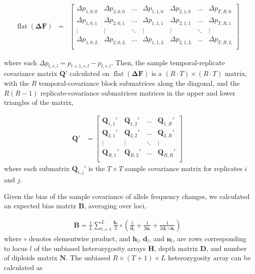 \documentclass[11pt]{article}
\DeclareMathOperator{\flt}{\mathrm{flat}}
\begin{document}
\begin{align}
    \flt(\mathbf{\Delta F}) &=
                    &\begin{bmatrix} 
    \Delta p_{1, 0, 0} & \Delta p_{2, 0, 0} & \ldots & \Delta p_{1, 1, 0} & \Delta p_{2, 1, 0} & \ldots & \Delta p_{T, R, 0}  \\
    \Delta p_{1, 0, 1} & \Delta p_{2, 0, 1} & \ldots & \Delta p_{1, 1, 1} & \Delta p_{2, 1, 1} & \ldots & \Delta p_{T, R, 1}  \\
    \vdots & \vdots & \ddots & \vdots & \vdots & \ddots & \vdots  \\
    \Delta p_{1, 0, L} & \Delta p_{2, 0, L} & \ldots & \Delta p_{1, 1, L} & \Delta p_{2, 1, L} & \ldots & \Delta p_{T, R, L}  \\
  \end{bmatrix} 
\end{align}

where each $\Delta p_{t, r, l} = p_{t+1, r, l} - p_{t, r, l}$. Then, the sample
temporal-replicate covariance matrix $\mathbf{Q}'$ calculated on
$\flt(\mathbf{\Delta F})$ is a $(R \cdot T) \times (R \cdot T)$ matrix, with
the $R$ temporal-covariance block submatrices along the diagonal, and the
$R(R-1)$ replicate-covariance submatrices matrices in the upper and lower
triangles of the matrix,

\begin{align}
	\mathbf{Q}' &= 
  \begin{bmatrix} 
		\mathbf{Q}_{1,1}' & \mathbf{Q}_{1, 2}' & \ldots & \mathbf{Q}_{1, R}' \\ 
		\mathbf{Q}_{2,1}' & \mathbf{Q}_{2, 2}' & \ldots & \mathbf{Q}_{2, R}' \\ 
		\vdots & \vdots & \ddots & \vdots \\
		\mathbf{Q}_{R,1}' & \mathbf{Q}_{R, 2}' & \ldots & \mathbf{Q}_{R, R}' \\ 
  \end{bmatrix} 
\end{align}
%
where each submatrix $\mathbf{Q}_{i,j}'$ is the $T \times T$ sample covariance
matrix for replicates $i$ and $j$.  

Given the bias of the sample covariance of allele frequency changes, we
calculated an expected bias matrix $\mathbf{B}$, averaging over loci,

\begin{align}
  \mathbf{B} = \frac{1}{L} \sum_{l=1}^L \frac{\mathbf{h}_l}{2} \circ \left( \frac{1}{\mathbf{d}_l} + \frac{1}{2\mathbf{n}_l} + \frac{1}{2\mathbf{d}_l \circ \mathbf{n}_l} \right)
\end{align}
%
where $\circ$ denotes elementwise product, and $\mathbf{h}_l$, $\mathbf{d}_l$,
and $\mathbf{n}_l$, are rows corresponding to locus $l$ of the unbiased
heterozygosity arrays $\mathbf{H}$, depth matrix $\mathbf{D}$, and number of
diploids matrix $\mathbf{N}$. The unbiased $R \times (T+1) \times L$
heterozygosity array can be calculated as  
\end{document}
